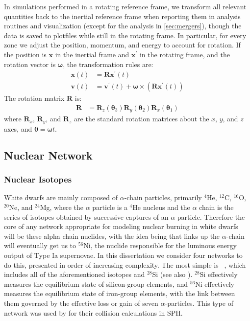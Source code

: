 \documentclass[12pt]{article}
\begin{document}
In simulations performed in a rotating reference frame, we transform all relevant
quantities back to the inertial reference frame when reporting them in analysis routines
and visualization (except for the analysis in \autoref{sec:mergers}), though the data is saved to plotfiles
while still in the rotating frame. In particular, for every zone we adjust the position,
momentum, and energy to account for rotation. If the position is $\mathbf{x}$ in the inertial
frame and $\mathbf{x}^\prime$ in the rotating frame, and the rotation vector is $\bm{\omega}$,
the transformation rules are:
\begin{align}
  \mathbf{x}(t) &= \mathbf{R}\mathbf{x}^\prime(t) \\
  \mathbf{v}(t) &= \mathbf{v}^\prime(t) + \bm{\omega} \times \left(\mathbf{R} \mathbf{x}^\prime(t)\right)
\end{align}
The rotation matrix $\mathbf{R}$ is:
\begin{align}
  \mathbf{R} &= \mathbf{R}_z({\bm{\theta}}_3) \mathbf{R}_y({\bm{\theta}}_2) \mathbf{R}_x({\bm{\theta}}_1)
\end{align}
where $\mathbf{R}_x$, $\mathbf{R}_y$, and $\mathbf{R}_z$ are the standard rotation matrices about
the $x$, $y$, and $z$ axes, and $\bm{\theta} = \bm{\omega} t$.



\subsection{Nuclear Network}
\label{sec:network}

\subsubsection{Nuclear Isotopes}
\label{sec:isotopes}

White dwarfs are mainly composed of $\alpha$-chain particles, primarily ${}^4$He,
${}^{12}$C, ${}^{16}$O, ${}^{20}$Ne, and ${}^{24}$Mg, where the $\alpha$ particle
is a ${}^4$He nucleus and the $\alpha$ chain is the series of isotopes obtained by
successive captures of an $\alpha$ particle. Therefore the core of
any network appropriate for modeling nuclear burning in white dwarfs will be
these alpha chain nuclides, with the idea being that links up the $\alpha$-chain
will eventually get us to ${}^{56}$Ni, the nuclide responsible for the luminous
energy output of Type Ia supernovae. In this dissertation we consider four networks
to do this, presented in order of increasing complexity. The most simple is
\isoseven\ \citep{timmes:2000}, which includes all of the aforementioned isotopes and
${}^{28}$Si (see also \citet{hix:1998}). ${}^{28}$Si effectively measures the
equilibrium state of silicon-group elements, and ${}^{56}$Ni effectively measures
the equilibrium state of iron-group elements, with the link between them governed
by the effective loss or gain of seven $\alpha$-particles. This type of network
was used by \citet{rosswog:2009} for their collision calculations in SPH.
\end{document}

